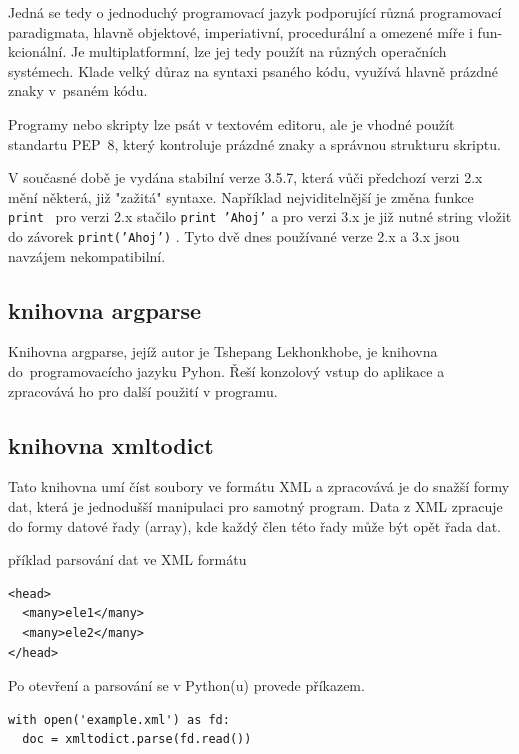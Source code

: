 Jedná se tedy o jednoduchý programovací jazyk podporující různá programovací 
paradigmata, hlavně objektové, imperiativní, procedurální a omezené míře i 
fun- kcionální. Je multiplatformní, lze jej tedy použít na různých operačních 
systémech. Klade velký důraz na syntaxi psaného kódu, využívá hlavně prázdné 
znaky v~psaném kódu.  

Programy nebo skripty lze psát v textovém editoru, ale je vhodné použít 
standartu PEP~8, který kontroluje prázdné znaky a správnou strukturu skriptu. 

V současné době je vydána stabilní verze 3.5.7, která vůči předchozí verzi 2.x
mění některá, již "zažitá" syntaxe. Například nejviditelnější je změna funkce 
{\tt print } pro verzi 2.x stačilo  {\tt print 'Ahoj'}  a pro verzi 3.x je již
nutné string vložit do závorek  {\tt print('Ahoj')}  . Tyto dvě dnes používané
verze 2.x a 3.x jsou navzájem nekompatibilní.
\cite{python} 
\cite{wikiPython} 
  
  
\subsection{knihovna argparse}
\label{argparse} 
Knihovna argparse, jejíž autor je Tshepang Lekhonkhobe, je knihovna 
do~programovacícho jazyku Pyhon. Řeší konzolový vstup do aplikace a zpracovává 
ho pro další použití v programu.\cite{argparse}


\subsection{knihovna xmltodict}
\label{xmltodict} 
Tato knihovna umí číst soubory ve formátu XML a zpracovává je do snažší formy 
dat, která je jednodušší manipulaci pro samotný program. Data z XML zpracuje
do formy datové řady (array), kde každý člen této řady může být opět řada dat.\cite{xmltodict}

příklad parsování dat ve XML formátu

{\scriptsize
\begin{lstlisting}
<head>
  <many>ele1</many>
  <many>ele2</many>
</head>
\end{lstlisting}
}

Po otevření a parsování se v Python(u) provede příkazem.

{\scriptsize
\lstset{language=Python}
\begin{lstlisting}
with open('example.xml') as fd: 
  doc = xmltodict.parse(fd.read()) 
\end{lstlisting}
}

